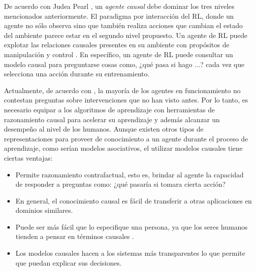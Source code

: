 De acuerdo con Judea Pearl \cite{pearl2018bookofwhy}, 
un \textit{agente causal} debe dominar los tres niveles mencionados anteriormente.
El paradigma por interacción del RL, donde un agente
no sólo observa sino que también realiza acciones que 
cambian el estado del ambiente parece estar 
en el segundo nivel propuesto.
Un agente de RL puede explotar las relaciones causales presentes
en su ambiente con propósitos de manipulación y control \cite{woodward2005making}.
En específico, un agente de RL puede consultar un modelo
causal para preguntarse cosas como, ¿qué pasa si hago ...?
cada vez que selecciona una acción durante su entrenamiento.


Actualmente, de acuerdo con \cite{pearl2018theoretical}, la mayoría de los agentes en funcionamiento no contestan preguntas sobre intervenciones que no han visto antes. 
Por lo tanto, es necesario equipar a
los algoritmos de aprendizaje con herramientas de razonamiento
causal para acelerar su aprendizaje y además alcanzar 
un desempeño al nivel de los humanos.
Aunque existen otros tipos de representaciones para proveer de
conocimiento a un agente durante el proceso de aprendizaje, como serían
modelos asociativos, el utilizar modelos causales tiene ciertas
ventajas:

\begin{itemize}

\item Permite razonamiento contrafactual, esto es, brindar al agente la
capacidad de responder a preguntas como: ¿qué pasaría si tomara cierta
acción? 
\item En general, 
el conocimiento causal es fácil de 
transferir a otras aplicaciones en dominios similares.
\item Puede ser más fácil que lo especifique una persona, ya que los seres humanos tienden a pensar en términos causales \cite{edmonds2018human, Gershman2017}.
\item Los modelos causales hacen a los sistemas más transparentes lo que permite que puedan explicar sus
decisiones.
\end{itemize}

